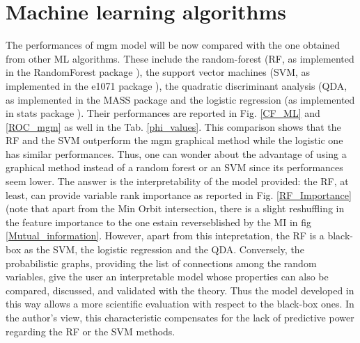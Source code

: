 \documentclass[12pt,%
               a4paper,%
               oneside,openany,%
               titlepage,%
               headinclude,footinclude,%
               BCOR5mm,%
               cleardoublepage=empty,%
               tablecaptionabove,%
               floatperchapter,
               ]{scrreprt}                 %
\begin{document}
\pagebreak

\section{Machine learning algorithms} The performances of mgm model will be now compared with the one obtained from other ML algorithms. These include the random-forest (RF, as implemented in the RandomForest package \cite{rfor}), the support vector machines (SVM, as implemented in the e1071 package \cite{dimitriadou2008misc}), the quadratic discriminant analysis (QDA, as implemented in the MASS package \cite{MASS} and the logistic regression (as implemented in stats package \cite{stats}). Their performances are reported in Fig. \ref{CF_ML} and \ref{ROC_mgm} as well in the Tab. \ref{phi_values}. This comparison shows that the RF and the SVM outperform the mgm graphical method while the logistic one has similar performances. Thus, one can wonder about the advantage of using a graphical method instead of a random forest or an SVM since its performances seem lower. The answer is the interpretability of the model provided: the RF, at least, can provide variable rank importance as reported in Fig. \ref{RF_Importance} (note that apart from the Min Orbit intersection, there is a slight reshuffling in the feature importance to the one estain reverseblished by the MI in fig \ref{Mutual_information}. However, apart from this intepretation, the RF is a black-box as the SVM, the logistic regression and the QDA. Conversely, the probabilistic graphs, providing the list of connections among the random variables, give the user an interpretable model whose properties can also be compared, discussed, and validated with the theory. Thus the model developed in this way allows a more scientific evaluation with respect to the black-box ones. In the author's view, this characteristic compensates for the lack of predictive power regarding the RF or the SVM methods. 
\end{document}
